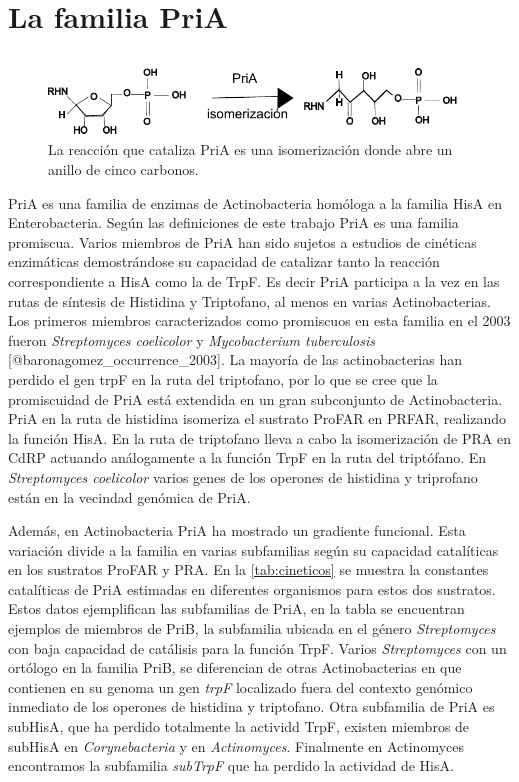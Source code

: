 \documentclass[]{article}
\title{}
\author{}
\date{}
\begin{document}
\section{La familia PriA}\label{la-familia-pria}

\begin{figure}[h!tbp]
\centering
\includegraphics[angle = 0,scale = 1]{chapter4/isomerizacion.pdf}
\caption[La reacción que cataliza PriA es una isomerización donde abre un anillo de cinco carbonos.]{\footnotesize{La reacción que cataliza PriA es una isomerización donde abre un anillo de cinco carbonos.}}
\label{fig:isomerizacion}
\end{figure}

PriA es una familia de enzimas de Actinobacteria homóloga a la familia
HisA en Enterobacteria. Según las definiciones de este trabajo PriA es
una familia promiscua. Varios miembros de PriA han sido sujetos a
estudios de cinéticas enzimáticas demostrándose su capacidad de
catalizar tanto la reacción correspondiente a HisA como la de TrpF. Es
decir PriA participa a la vez en las rutas de síntesis de Histidina y
Triptofano, al menos en varias Actinobacterias. Los primeros miembros
caracterizados como promiscuos en esta familia en el 2003 fueron
\emph{Streptomyces coelicolor} y \emph{Mycobacterium tuberculosis}
{[}@baronagomez\_occurrence\_2003{]}. La mayoría de las actinobacterias
han perdido el gen trpF en la ruta del triptofano, por lo que se cree
que la promiscuidad de PriA está extendida en un gran subconjunto de
Actinobacteria. PriA en la ruta de histidina isomeriza el sustrato
ProFAR en PRFAR, realizando la función HisA. En la ruta de triptofano
lleva a cabo la isomerización de PRA en CdRP actuando análogamente a la
función TrpF en la ruta del triptófano. En \emph{Streptomyces
coelicolor} varios genes de los operones de histidina y triprofano están
en la vecindad genómica de PriA.

Además, en Actinobacteria PriA ha mostrado un gradiente funcional. Esta
variación divide a la familia en varias subfamilias según su capacidad
catalíticas en los sustratos ProFAR y PRA. En la \autoref{tab:cineticos}
se muestra la constantes catalíticas de PriA estimadas en diferentes
organismos para estos dos sustratos. Estos datos ejemplifican las
subfamilias de PriA, en la tabla se encuentran ejemplos de miembros de
PriB, la subfamilia ubicada en el género \emph{Streptomyces} con baja
capacidad de catálisis para la función TrpF. Varios \emph{Streptomyces}
con un ortólogo en la familia PriB, se diferencian de otras
Actinobacterias en que contienen en su genoma un gen \emph{trpF}
localizado fuera del contexto genómico inmediato de los operones de
histidina y triptofano. Otra subfamilia de PriA es subHisA, que ha
perdido totalmente la actividd TrpF, existen miembros de subHisA en
\emph{Corynebacteria} y en \emph{Actinomyces}. Finalmente en Actinomyces
encontramos la subfamilia \emph{subTrpF} que ha perdido la actividad de
HisA.
\end{document}
